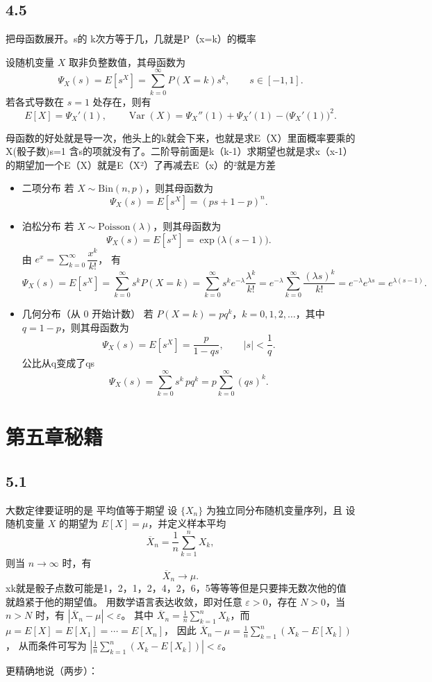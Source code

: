 \section{4.5}
\begin{note}
把母函数展开。s的
k次方等于几，几就是P（x=k）的概率
\end{note}
\begin{definition}
设随机变量 $X$ 取非负整数值，其母函数为
\[
\Psi_X(s)=E[s^X]=\sum_{k=0}^{\infty}P(X=k)s^k,\qquad s\in[-1,1].
\]
若各式导数在 $s=1$ 处存在，则有
\[
E[X]=\Psi_X'(1),
\qquad
\operatorname{Var}(X)=\Psi_X''(1)+\Psi_X'(1)-\big(\Psi_X'(1)\big)^2.
\]
\end{definition}
\begin{note}
    母函数的好处就是导一次，他头上的k就会下来，也就是求E（X）里面概率要乘的X(骰子数)s=1 含s的项就没有了。二阶导前面是k（k-1）求期望也就是求x（x-1）的期望加一个E（X）就是E（X²）了再减去E（x）的²就是方差
\end{note}
\begin{itemize}
  \item 二项分布  
  若 $X\sim \mathrm{Bin}(n,p)$，则其母函数为
  \[
  \Psi_X(s)=E[s^X]=(ps+1-p)^n.
  \]

  \item 泊松分布  
  若 $X\sim \mathrm{Poisson}(\lambda)$，则其母函数为
  \[
  \Psi_X(s)=E[s^X]=\exp\!\big(\lambda(s-1)\big).
  \]
由
$e^{x}=\sum_{k=0}^{\infty}\dfrac{x^{k}}{k!}$，
有
\[
\Psi_X(s)=E[s^X]
=\sum_{k=0}^{\infty}s^kP(X=k)
=\sum_{k=0}^{\infty}s^k e^{-\lambda}\frac{\lambda^k}{k!}
=e^{-\lambda}\sum_{k=0}^{\infty}\frac{(\lambda s)^k}{k!}
=e^{-\lambda}e^{\lambda s}
=e^{\lambda(s-1)}.
\]
  \item 几何分布（从 $0$ 开始计数）  
  若 $P(X=k)=p q^{k}$，$k=0,1,2,\dots$，其中 $q=1-p$，则其母函数为
  \[
  \Psi_X(s)=E[s^X]=\frac{p}{1-q s},\qquad |s|<\frac{1}{q}.
  \]
  公比从q变成了qs\[
\Psi_X(s)
=\sum_{k=0}^{\infty} s^k\,p q^k
=p\sum_{k=0}^{\infty}(qs)^k.
\]
\end{itemize}
\chapter{第五章秘籍}
\section*{5.1}
\begin{note}
    大数定律要证明的是
    平均值等于期望
    设 $\{X_n\}$ 为独立同分布随机变量序列，且 设随机变量 $X$ 的期望为 $E[X]=\mu$，并定义样本平均
\[
\overline X_n=\frac{1}{n}\sum_{k=1}^n X_k,
\]
则当 $n\to\infty$ 时，有
\[
\overline X_n \longrightarrow \mu.
\]
xk就是骰子点数可能是1，2，1，2，4，2，6，5等等等但是只要摔无数次他的值就趋紧于他的期望值。
用数学语言表达收敛，即对任意 $\varepsilon>0$，存在 $N>0$，当 $n>N$ 时，有
$|\overline X_n-\mu|<\varepsilon$。
其中
$\overline X_n=\frac1n\sum_{k=1}^n X_k$，而 $\mu=E[X]=E[X_1]=\cdots=E[X_n]$，
因此
$\overline X_n-\mu=\frac1n\sum_{k=1}^n(X_k-E[X_k])$，
从而条件可写为
$\left|\frac1n\sum_{k=1}^n(X_k-E[X_k])\right|<\varepsilon$。
\end{note}
 更精确地说（两步）：


